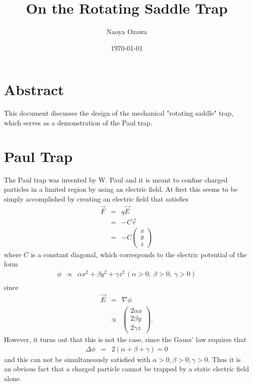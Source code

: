 \documentclass{article}
\title{On the Rotating Saddle Trap}
\author{Naoya Ozawa}
\date{\today}
\begin{document}
\maketitle

\section{Abstract}
This document discusses the design of the mechanical "rotating saddle" trap\cite{}, which serves as a demonstration of the Paul trap\cite{PaulNobel}.

\section{Paul Trap}
The Paul trap was invented by W. Paul and it is meant to confine charged particles in a limited region by using an electric field. At first this seems to be simply accomplished by creating an electric field that satisfies
\begin{eqnarray*}
\vec{F} & = & q \vec{E} \\
& = & -C \vec{r} \\
& = & -C \left(
\begin{array}{c}
	x \\
	y \\
	z
\end{array} \right)
\end{eqnarray*}
where $C$ is a constant diagonal, which corresponds to the electric potential of the form
\begin{eqnarray*}
\phi & \propto & \alpha x^2 + \beta y^2 + \gamma z^2 \, (\alpha>0,\ \beta>0,\ \gamma>0) \\
\end{eqnarray*}
since
\begin{eqnarray*}
\vec{E} & = & \nabla \phi \\
& \propto & \left(
\begin{array}{c}
	2\alpha x \\
	2\beta y \\
	2\gamma z
\end{array} \right).
\end{eqnarray*}
However, it turns out that this is not the case, since the Gauss' law requires that
\begin{eqnarray*}
\Delta \phi & = & 2 (\alpha + \beta + \gamma) = 0
\end{eqnarray*}
and this can not be simultaneously satisfied with $\alpha>0, \beta>0, \gamma>0$. Thus it is an obvious fact that a charged particle cannot be trapped by a static electric field alone. \\
\end{document}
